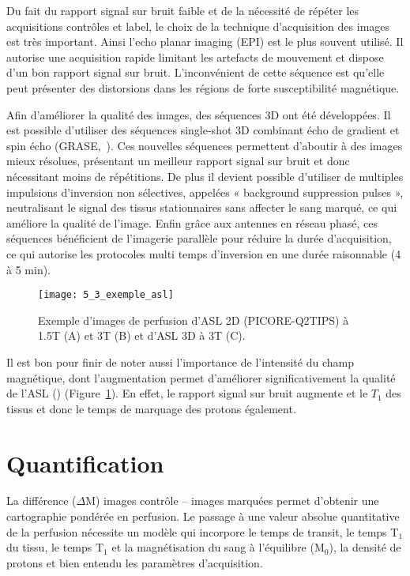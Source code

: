Du fait du rapport signal sur bruit faible et de la nécessité de répéter les acquisitions contrôles et label, le choix de la technique d’acquisition des images est très important. Ainsi l’echo planar imaging (EPI) est le plus souvent utilisé. Il autorise une acquisition rapide limitant les artefacts de mouvement et dispose d’un bon rapport signal sur bruit. L’inconvénient de cette séquence est qu’elle peut présenter des distorsions dans les régions de forte susceptibilité magnétique. 

Afin d’améliorer la qualité des images, des séquences 3D ont été développées. Il est possible d’utiliser des séquences single-shot 3D combinant écho de gradient et spin écho (GRASE,~\cite{Gunther2005}). Ces nouvelles séquences permettent d’aboutir à des images mieux résolues, présentant un meilleur rapport signal sur bruit et donc nécessitant moins de répétitions. De plus il devient possible d’utiliser de multiples impulsions d’inversion non sélectives, appelées « background suppression pulses », neutralisant le signal des tissus stationnaires sans affecter le sang marqué, ce qui améliore la qualité de l’image. Enfin grâce aux antennes en réseau phasé, ces séquences bénéficient de l’imagerie parallèle pour réduire la durée d’acquisition, ce qui autorise les protocoles multi temps d’inversion en une durée raisonnable (4 à 5 min).

\begin{figure}[!t]
\centering
\texttt{[image: 5\_3\_exemple\_asl]}
\caption{Exemple d'images de perfusion d’ASL 2D (PICORE-Q2TIPS) à 1.5T (A) et 3T (B) et d’ASL 3D à 3T (C).}
\label{fig:5_3_exemple_asl}	
\end{figure}
Il est bon pour finir de noter aussi l’importance de l’intensité du champ magnétique, dont l’augmentation permet d’améliorer significativement la qualité de l’ASL (\cite{Golay2006}) (Figure~\ref{fig:5_3_exemple_asl}). En effet, le rapport signal sur bruit augmente et le $T_1$ des tissus et donc le temps de marquage des protons également.
\section{Quantification}
La différence ($\Delta$M) images contrôle – images marquées permet d’obtenir une cartographie pondérée en perfusion. Le passage à une valeur absolue quantitative de la perfusion nécessite un modèle qui incorpore le temps de transit, le temps T$_1$ du tissu, le temps T$_1$ et la magnétisation du sang à l’équilibre (M$_0$), la densité de protons et bien entendu les paramètres d’acquisition.

